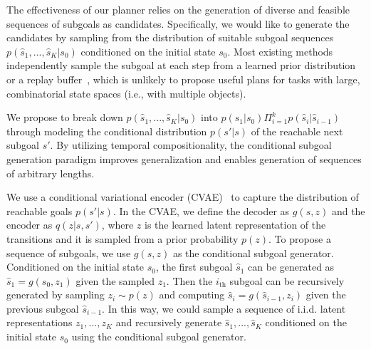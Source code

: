 
The effectiveness of our planner relies on the generation of diverse and feasible sequences of subgoals as candidates. Specifically, we would like to generate the candidates by sampling from the distribution of suitable subgoal sequences $p(\hat{s}_1, ..., \hat{s}_K | s_0)$ conditioned on the initial state $s_0$. Most existing methods
independently sample the subgoal at each step from a learned prior distribution~\citep{Pertsch2020LongHorizonVP} or a replay buffer~\citep{Eysenbach2019SearchOT}, which is unlikely to propose useful plans for tasks with large, combinatorial state spaces (i.e., with multiple objects).

We propose to break down $p(\hat{s}_1, ..., \hat{s}_K | s_0)$ into $p(\hat{s}_1 | s_0) \Pi_{i=1}^k p(\hat{s}_i | \hat{s}_{i - 1})$ through modeling the conditional distribution $p(s' | s)$ of the reachable next subgoal $s'$. By utilizing temporal compositionality, the conditional subgoal generation paradigm improves generalization and enables generation of sequences of arbitrary lengths.

We use a conditional variational encoder (CVAE)~\citep{sohn2015cvae} to capture the distribution of reachable goals $p(s' | s)$. In the CVAE, we define the decoder as $g(s, z)$ and the encoder as $q(z | s, s')$, where $z$ is the learned latent representation of the transitions and it is sampled from a prior probability $p(z)$. To propose a sequence of subgoals, we use $g(s, z)$ as the conditional subgoal generator. Conditioned on the initial state $s_0$, the first subgoal $\hat{s}_1$ can be generated as $\hat{s}_1 = g(s_0, z_1)$ given the sampled $z_1$. Then the $i_\text{th}$ subgoal can be recursively generated by sampling $z_i \sim p(z)$ and computing $\hat{s}_i = g(\hat{s}_{i - 1}, z_i)$ given the previous subgoal $\hat{s}_{i - 1}$. In this way, we could sample a sequence of i.i.d. latent representations $z_1, ..., z_K$ and recursively generate $\hat{s}_1, ..., \hat{s}_K$ conditioned on the initial state $s_0$ using the conditional subgoal generator.

